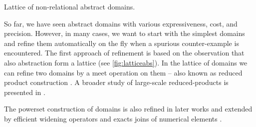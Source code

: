\begin{marginfigure}%
    \centering
{}
    \caption{Lattice of non-relational abstract domains.}
    \label{fig:latticeabs}%
\end{marginfigure}%


So far, we have seen abstract domains with various expressiveness, cost, and
precision. However, in many cases, we want to start with the simplest domains
and refine them automatically on the fly when a spurious counter-example is
encountered. The first approach of refinement is based on the observation that
also abstraction form a lattice (see \autoref{fig:latticeabs}). In the lattice
of domains we can refine two domains by a meet operation on them -- also known
as reduced product construction \cite{Toubhans2013, Cousot2011b}. A broader
study of large-scale reduced-products is presented in \cite{Cousot2007}.

The powerset construction of domains \cite{Cousot1979} is also refined in later works
\cite{File1999} and extended by efficient widening operators \cite{Bagnara2004}
and exacts joins of numerical elements \cite{Bagnara2010}.

